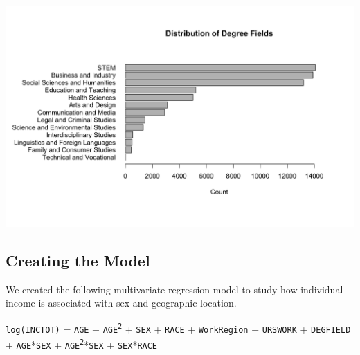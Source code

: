 \documentclass{article}
\newenvironment{custommargins}[2]{%
    \newgeometry{left=#1, right=#2}%
}{%
    \restoregeometry%
}
\begin{document}
\begin{custommargins}{2cm}{2cm}
\begin{minipage}{0.49\textwidth}
\end{minipage}
\begin{minipage}{0.49\textwidth}
    \centering
    \includegraphics[width=\textwidth]{../figures/pre/deg_field_plot.png}
\end{minipage}
\vfill

\end{custommargins}



\vspace{\baselineskip}
\subsection*{Creating the Model}
We created the following multivariate regression model to study how individual income is associated with sex and geographic location. 

\begin{center}
    \texttt{log(INCTOT)} = \texttt{AGE} + \texttt{AGE\textsuperscript{2}} + \texttt{SEX} + \texttt{RACE} + \texttt{WorkRegion} + \texttt{URSWORK}  + \texttt{DEGFIELD} + \texttt{AGE}*\texttt{SEX} + \texttt{AGE\textsuperscript{2}}*\texttt{SEX} + \texttt{SEX}*\texttt{RACE}
\end{center}
\end{document}
